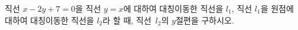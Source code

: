 직선 $x-2y+7=0$을 직선 $y=x$에 대하여 대칭이동한 직선을 $l_1$, 직선 $l_1$을 원점에 대하여 대칭이동한 직선을 $l_2$라 할 때, 직선~$l_2$의 $y$절편을 구하시오.
